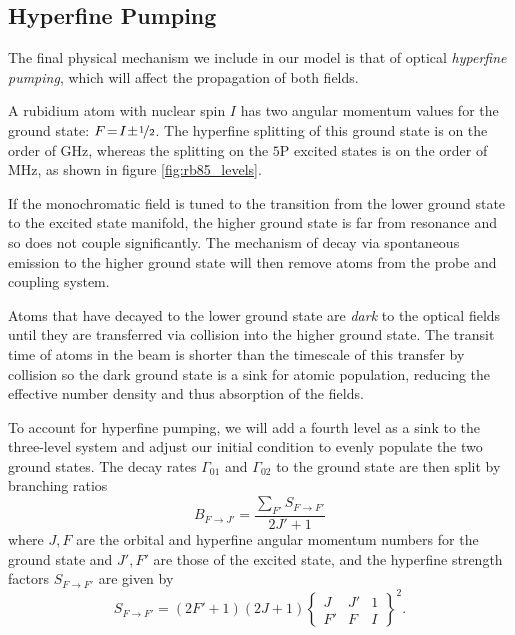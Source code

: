   \subsection{Hyperfine Pumping}

    The final physical mechanism we include in our model is that of
    optical \textit{hyperfine pumping}, which will affect the propagation of
    both fields.\cite{Razdan1999,Im2001,Nakayama1985}

    A rubidium atom with nuclear spin $I$ has two angular momentum values for
    the ground state: $F\!=\!I\!\pm\!\nicefrac{1}{2}$. The hyperfine splitting
    of this ground state is on the order of \unit{GHz}, whereas the splitting on
    the $5$P excited states is on the order of \unit{MHz}, as
    shown in figure \ref{fig:rb85_levels}.

    If the monochromatic field is tuned to the transition from the lower ground
    state to the excited state manifold, the higher ground state is far from
    resonance and so does not couple significantly. The mechanism of decay via
    spontaneous emission to the higher ground state will then remove atoms from
    the probe and coupling system.\cite{Smith2004}

    Atoms that have decayed to the lower ground state are \textit{dark} to the
    optical fields until they are transferred via collision into the higher
    ground state. The transit time of atoms in the beam is shorter than the
    timescale of this transfer by collision so the dark ground state is a sink
    for atomic population, reducing the effective number density and thus
    absorption of the fields.\cite{Sherlock2009}

    To account for hyperfine pumping, we will add a fourth level as a sink to
    the three-level system and adjust our initial condition to evenly populate
    the two ground states. The decay rates $\Gamma_{01}$ and $\Gamma_{02}$ to
    the ground state are then split by branching ratios
    \begin{equation}\label{eqn:hf_branching}
      B_{F \rightarrow J'} = \frac{\sum_{F'} S_{F \rightarrow F'}}{2J' + 1}
    \end{equation}
    where $J, F$ are the orbital and hyperfine angular momentum numbers for the ground state and $J', F'$ are those of the excited state, and the hyperfine strength factors $S_{F \rightarrow F'}$ are given
    by\cite{Steck2001}
    \begin{equation}\label{eqn:strength_factor}
      S_{F \rightarrow F'} = (2F' + 1)(2J + 1)
        \begin{Bmatrix}
        J & J' & 1 \\
        F' & F & I
        \end{Bmatrix}^2.
    \end{equation}

